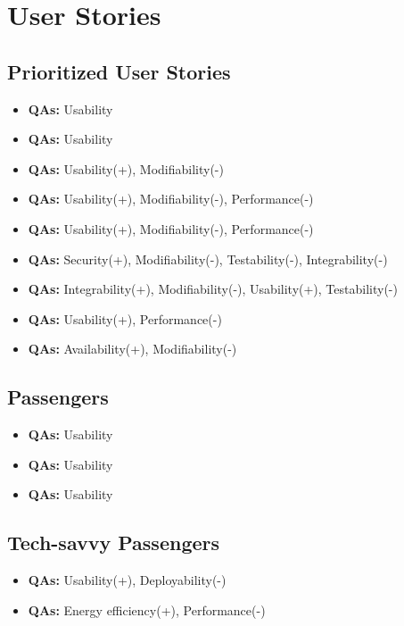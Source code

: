 \section{User Stories}

\subsection{Prioritized User Stories}
\begin{itemize}
    \item \userStoryOne \textbf{QAs:} Usability
    \item \userStoryTwo \textbf{QAs:} Usability
    \item \userStoryThirteen \textbf{QAs:} Usability(+), Modifiability(-)
    \item \userStoryFifteen \textbf{QAs:} Usability(+), Modifiability(-), Performance(-)
    \item \userStorySixteen \textbf{QAs:} Usability(+), Modifiability(-), Performance(-)
    \item \userStoryEighteen \textbf{QAs:} Security(+), Modifiability(-), Testability(-), Integrability(-)
    \item \userStoryTwentyThree \textbf{QAs:} Integrability(+), Modifiability(-), Usability(+), Testability(-)
    \item \userStoryTwentySix \textbf{QAs:} Usability(+), Performance(-)
    \item \userStoryTwentySeven \textbf{QAs:} Availability(+), Modifiability(-)
\end{itemize}

\subsection{Passengers}
\begin{itemize}
    \item \userStoryOne \textbf{QAs:} Usability
    \item \userStoryTwo \textbf{QAs:} Usability
    \item \userStoryThree \textbf{QAs:} Usability
\end{itemize}

\subsection{Tech-savvy Passengers}
\begin{itemize}
    \item \userStoryFour \textbf{QAs:} Usability(+), Deployability(-)
    \item \userStoryFive \textbf{QAs:} Energy efficiency(+), Performance(-)
\end{itemize}


